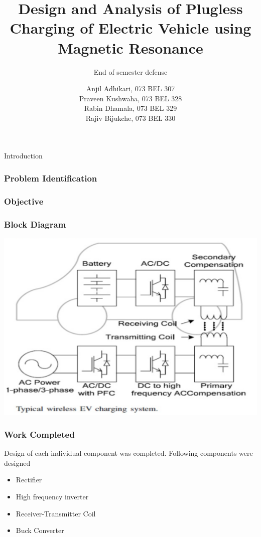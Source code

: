 \documentclass{beamer}
\title[Short Paper Title] %
{Design and Analysis of Plugless Charging of Electric Vehicle using Magnetic Resonance}
\subtitle
{End of semester defense} %
\author[]{Anjil Adhikari, 073 BEL 307 \\
Praveen Kushwaha, 073 BEL 328 \\
Rabin Dhamala, 073 BEL 329 \\
Rajiv Bijukche, 073 BEL 330 
}
\begin{document}
\frame{\titlepage}



\begin{frame}{Introduction}

\end{frame}

\begin{frame}
  \frametitle{Problem Identification}
\end{frame}

\begin{frame}
\frametitle{Objective}

\end{frame}

\begin{frame}
  \begin{center}
  \frametitle{Block Diagram}
\includegraphics[scale=0.5]{jpgs/wirelessEV.PNG}
  \end{center}
\end{frame}

\begin{frame}
  \frametitle{Work Completed}
  Design of each individual component was completed. Following components were designed
  \begin{itemize}
    \item Rectifier
    \item High frequency inverter
    \item Receiver-Transmitter Coil
    \item Buck Converter
  \end{itemize}
\end{frame}
\end{document}
